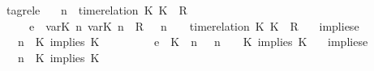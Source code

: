 \begin{isabellebody}
{\isacharbar}\ tagrel{\isacharunderscore}e{\isacharcolon}\isanewline
\ \ {\isacartoucheopen}{\isacharparenleft}{\isasymGamma}{\isacharcomma}\ n\ {\isasymturnstile}\ {\isacharparenleft}{\isacharparenleft}time{\isacharminus}relation\ {\isasymlfloor}K\ K\ {\isasymin}\ R{\isacharparenright}\ {\isacharhash}\ {\isasymPsi}{\isacharparenright}\ {\isasymtriangleright}\ {\isasymPhi}{\isacharparenright}\isanewline
\ \ \ \ \ {\isasymhookrightarrow}\isactrlsub e\ \ {\isacharparenleft}{\isacharparenleft}{\isacharparenleft}{\isasymlfloor}{\isasymtau}\isactrlsub v\isactrlsub a\isactrlsub r{\isacharparenleft}K\ n{\isacharparenright}{\isacharcomma}\ {\isasymtau}\isactrlsub v\isactrlsub a\isactrlsub r{\isacharparenleft}K\ n{\isacharparenright}{\isasymrfloor}\ {\isasymin}\ R{\isacharparenright}\ {\isacharhash}\ {\isasymGamma}{\isacharparenright}{\isacharcomma}\ n\ {\isasymturnstile}\ {\isasymPsi}\ {\isasymtriangleright}\ {\isacharparenleft}{\isacharparenleft}time{\isacharminus}relation\ {\isasymlfloor}K\ K\ {\isasymin}\ R{\isacharparenright}\ {\isacharhash}\ {\isasymPhi}{\isacharparenright}{\isacharparenright}{\isacartoucheclose}\isanewline
{\isacharbar}\ implies{\isacharunderscore}e{}{\isacharcolon}\isanewline
\ \ {\isacartoucheopen}{\isacharparenleft}{\isasymGamma}{\isacharcomma}\ n\ {\isasymturnstile}\ {\isacharparenleft}{\isacharparenleft}K\ implies\ K\ {\isacharhash}\ {\isasymPsi}{\isacharparenright}\ {\isasymtriangleright}\ {\isasymPhi}{\isacharparenright}\isanewline
\ \ \ \ \ {\isasymhookrightarrow}\isactrlsub e\ \ {\isacharparenleft}{\isacharparenleft}{\isacharparenleft}K\ {\isasymnot}{\isasymUp}\ n{\isacharparenright}\ {\isacharhash}\ {\isasymGamma}{\isacharparenright}{\isacharcomma}\ n\ {\isasymturnstile}\ {\isasymPsi}\ {\isasymtriangleright}\ {\isacharparenleft}{\isacharparenleft}K\ implies\ K\ {\isacharhash}\ {\isasymPhi}{\isacharparenright}{\isacharparenright}{\isacartoucheclose}\isanewline
{\isacharbar}\ implies{\isacharunderscore}e{}{\isacharcolon}\isanewline
\ \ {\isacartoucheopen}{\isacharparenleft}{\isasymGamma}{\isacharcomma}\ n\ {\isasymturnstile}\ {\isacharparenleft}{\isacharparenleft}K\ implies\ K\ {\isacharhash}\ {\isasymPsi}{\isacharparenright}\ {\isasymtriangleright}\ {\isasymPhi}{\isacharparenright}\isanewline

\end{isabellebody}
